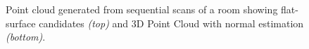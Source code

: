 			\begin{figure}[h!]
				\centering
				\caption{Point cloud generated from sequential scans of a room showing flat-surface candidates \emph{(top)} and 3D Point Cloud with normal estimation \emph{(bottom)}.}
				\label{fig::surface_estimation}
			\end{figure}